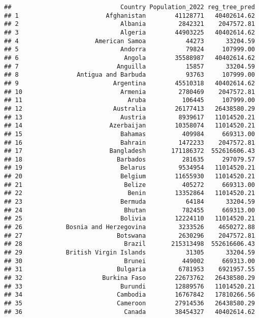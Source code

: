 \documentclass[
]{article}
\begin{document}
\begin{verbatim}
##                              Country Population_2022 reg_tree_pred
## 1                        Afghanistan        41128771   40402614.62
## 2                            Albania         2842321    2047572.81
## 3                            Algeria        44903225   40402614.62
## 4                     American Samoa           44273      33204.59
## 5                            Andorra           79824     107999.00
## 6                             Angola        35588987   40402614.62
## 7                           Anguilla           15857      33204.59
## 8                Antigua and Barbuda           93763     107999.00
## 9                          Argentina        45510318   40402614.62
## 10                           Armenia         2780469    2047572.81
## 11                             Aruba          106445     107999.00
## 12                         Australia        26177413   26438580.29
## 13                           Austria         8939617   11014520.21
## 14                        Azerbaijan        10358074   11014520.21
## 15                           Bahamas          409984     669313.00
## 16                           Bahrain         1472233    2047572.81
## 17                        Bangladesh       171186372  552616606.43
## 18                          Barbados          281635     297079.57
## 19                           Belarus         9534954   11014520.21
## 20                           Belgium        11655930   11014520.21
## 21                            Belize          405272     669313.00
## 22                             Benin        13352864   11014520.21
## 23                           Bermuda           64184      33204.59
## 24                            Bhutan          782455     669313.00
## 25                           Bolivia        12224110   11014520.21
## 26            Bosnia and Herzegovina         3233526    4650272.88
## 27                          Botswana         2630296    2047572.81
## 28                            Brazil       215313498  552616606.43
## 29            British Virgin Islands           31305      33204.59
## 30                            Brunei          449002     669313.00
## 31                          Bulgaria         6781953    6921957.55
## 32                      Burkina Faso        22673762   26438580.29
## 33                           Burundi        12889576   11014520.21
## 34                          Cambodia        16767842   17810266.56
## 35                          Cameroon        27914536   26438580.29
## 36                            Canada        38454327   40402614.62

\end{verbatim}
\end{document}
